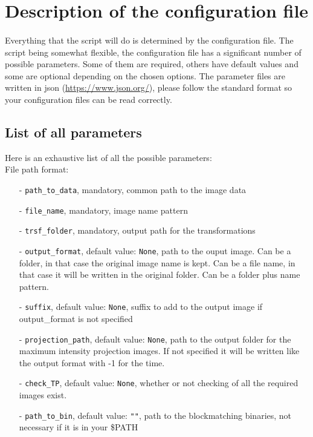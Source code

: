 \documentclass[10pt,a4paper]{article}
\begin{document}
\section{Description of the configuration file}
\paragraph{}Everything that the script will do is determined by the configuration file. The script being somewhat flexible, the configuration file has a significant number of possible parameters. Some of them are required, others have default values and some are optional depending on the chosen options. The parameter files are written in json (\url{https://www.json.org/}), please follow the standard format so your configuration files can be read correctly.
\subsection{List of all parameters}
Here is an exhaustive list of all the possible parameters:\\
File path format:
\begin{itemize}
\item[-] \texttt{path\_to\_data}, mandatory, common path to the image data
\item[-] \texttt{file\_name}, mandatory, image name pattern
\item[-] \texttt{trsf\_folder}, mandatory, output path for the transformations
\item[-] \texttt{output\_format}, default value: \texttt{None}, path to the ouput image. Can be a folder, in that case the original image name is kept. Can be a file name, in that case it will be written in the original folder. Can be a folder plus name pattern.
\item[-] \texttt{suffix}, default value: \texttt{None}, suffix to add to the output image if output\_format is not specified
\item[-] \texttt{projection\_path}, default value: \texttt{None}, path to the output folder for the maximum intensity projection images. If not specified it will be written like the output format with -1 for the time.
\item[-] \texttt{check\_TP}, default value: \texttt{None}, whether or not checking of all the required images exist.
\item[-] \texttt{path\_to\_bin}, default value: \texttt{""}, path to the blockmatching binaries, not necessary if it is in your \$PATH
\end{itemize}~\\
\end{document}
